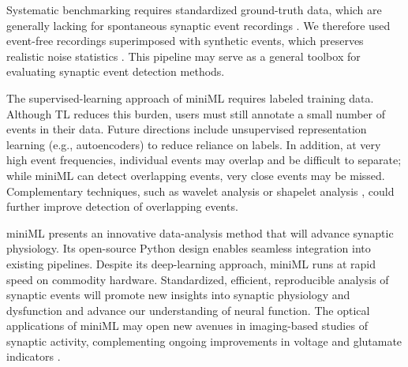 \documentclass[9pt,lineno]{article}
\begin{document}
Systematic benchmarking requires standardized ground-truth data, which are generally lacking for spontaneous synaptic event recordings \citep{Theis2016}. We therefore used event-free recordings superimposed with synthetic events, which preserves realistic noise statistics \citep{Merel2016,PerniaAndrade2012}. This pipeline may serve as a general toolbox for evaluating synaptic event detection methods.

The supervised-learning approach of miniML requires labeled training data. Although TL reduces this burden, users must still annotate a small number of events in their data. Future directions include unsupervised representation learning (e.g., autoencoders) to reduce reliance on labels. In addition, at very high event frequencies, individual events may overlap and be difficult to separate; while miniML can detect overlapping events, very close events may be missed. Complementary techniques, such as wavelet analysis or shapelet analysis \citep{BatalHauskrecht2009,YeKeogh2009}, could further improve detection of overlapping events.

miniML presents an innovative data-analysis method that will advance synaptic physiology. Its open-source Python design enables seamless integration into existing pipelines. Despite its deep-learning approach, miniML runs at rapid speed on commodity hardware. Standardized, efficient, reproducible analysis of synaptic events will promote new insights into synaptic physiology and dysfunction \citep{Lepeta2016,ZoghbiBear2012} and advance our understanding of neural function. The optical applications of miniML may open new avenues in imaging-based studies of synaptic activity, complementing ongoing improvements in voltage and glutamate indicators \citep{Abdelfattah2023,Ralowicz2024,SjulsonMiesenbock2007,Wilt2013}.



\end{document}
